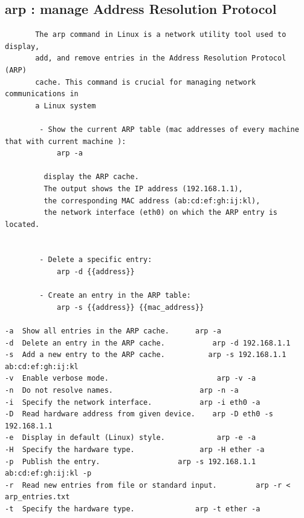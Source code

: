 \documentclass[a4paper,12pt]{article}
\begin{document}
\subsection{arp : manage Address Resolution Protocol}
\begin{verbatim}
       The arp command in Linux is a network utility tool used to display,    
       add, and remove entries in the Address Resolution Protocol (ARP) 
       cache. This command is crucial for managing network communications in 
       a Linux system
           
        - Show the current ARP table (mac addresses of every machine that with current machine ):
            arp -a

         display the ARP cache. 
         The output shows the IP address (192.168.1.1),
         the corresponding MAC address (ab:cd:ef:gh:ij:kl),
         the network interface (eth0) on which the ARP entry is located.


        - Delete a specific entry:
            arp -d {{address}}

        - Create an entry in the ARP table:
            arp -s {{address}} {{mac_address}}

-a	Show all entries in the ARP cache.	    arp -a
-d	Delete an entry in the ARP cache.	        arp -d 192.168.1.1
-s	Add a new entry to the ARP cache.	       arp -s 192.168.1.1 ab:cd:ef:gh:ij:kl
-v	Enable verbose mode.	                     arp -v -a
-n	Do not resolve names.	                 arp -n -a
-i	Specify the network interface.	         arp -i eth0 -a
-D	Read hardware address from given device.	arp -D eth0 -s 192.168.1.1
-e	Display in default (Linux) style.	         arp -e -a
-H	Specify the hardware type.	             arp -H ether -a
-p	Publish the entry.	                arp -s 192.168.1.1 ab:cd:ef:gh:ij:kl -p
-r	Read new entries from file or standard input.	      arp -r < arp_entries.txt
-t	Specify the hardware type.	            arp -t ether -a       
       
\end{verbatim}
\end{document}
